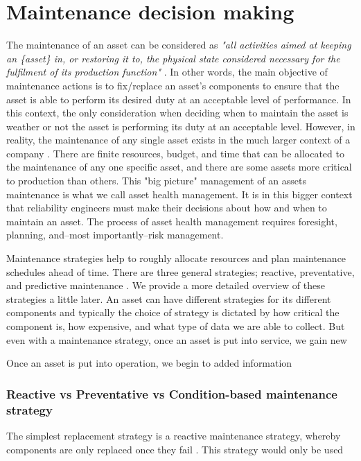 \section{Maintenance decision making}
\label{sec:decisions}

The maintenance of an asset can be considered as \textit{"all activities aimed at keeping an \{asset\} in, or restoring it to, the physical state considered necessary for the fulfilment of its production function"} \citep{geraerds1985}. In other words, the main objective of maintenance actions is to fix/replace an asset's components to ensure that the asset is able to perform its desired duty at an acceptable level of performance. In this context, the only consideration when deciding when to maintain the asset is weather or not the asset is performing its duty at an acceptable level. However, in reality, the maintenance of any single asset exists in the much larger context of a company \citep{jardine2013}. There are finite resources, budget, and time that can be allocated to the maintenance of any one specific asset, and there are some assets more critical to production than others. This "big picture" management of an assets maintenance is what we call asset health management. It is in this bigger context that reliability engineers must make their decisions about how and when to maintain an asset. The process of asset health management requires foresight, planning, and--most importantly--risk management.

Maintenance strategies help to roughly allocate resources and plan maintenance schedules ahead of time. There are three general strategies; reactive, preventative, and predictive maintenance \citep{}. We provide a more detailed overview of these strategies a little later. An asset can have different strategies for its different components and typically the choice of strategy is dictated by how critical the component is, how expensive, and what type of data we are able to collect. But even with a maintenance strategy, once an asset is put into service, we gain new 


Once an asset is put into operation, we begin to added information 

\subsubsection*{Reactive vs Preventative vs Condition-based maintenance strategy}

The simplest replacement strategy is a reactive maintenance strategy, whereby components are only replaced once they fail \citep{heng2009}. This strategy would only be used 

